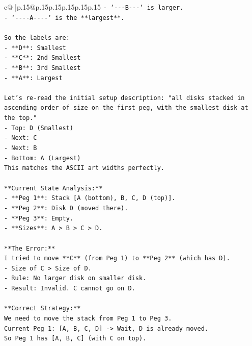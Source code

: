 \documentclass{article}
\begin{document}
{\begin{supertabular}{c@{$\;$}|p{.15\linewidth}@{}p{.15\linewidth}p{.15\linewidth}p{.15\linewidth}p{.15\linewidth}p{.15\linewidth}}
{{{\texttt{{-} `{-}{-}{-}B{-}{-}{-}` is larger.} \\
\texttt{{-} `{-}{-}{-}{-}A{-}{-}{-}{-}` is the **largest**.} \\
\\ 
\texttt{So the labels are:} \\
\texttt{{-} **D**: Smallest} \\
\texttt{{-} **C**: 2nd Smallest} \\
\texttt{{-} **B**: 3rd Smallest} \\
\texttt{{-} **A**: Largest} \\
\\ 
\texttt{Let's re{-}read the initial setup description: "all disks stacked in ascending order of size on the first peg, with the smallest disk at the top."} \\
\texttt{{-} Top: D (Smallest)} \\
\texttt{{-} Next: C} \\
\texttt{{-} Next: B} \\
\texttt{{-} Bottom: A (Largest)} \\
\texttt{This matches the ASCII art widths perfectly.} \\
\\ 
\texttt{**Current State Analysis:**} \\
\texttt{{-} **Peg 1**: Stack {[}A (bottom), B, C, D (top){]}.} \\
\texttt{{-} **Peg 2**: Disk D (moved there).} \\
\texttt{{-} **Peg 3**: Empty.} \\
\texttt{{-} **Sizes**: A > B > C > D.} \\
\\ 
\texttt{**The Error:**} \\
\texttt{I tried to move **C** (from Peg 1) to **Peg 2** (which has D).} \\
\texttt{{-} Size of C > Size of D.} \\
\texttt{{-} Rule: No larger disk on smaller disk.} \\
\texttt{{-} Result: Invalid. C cannot go on D.} \\
\\ 
\texttt{**Correct Strategy:**} \\
\texttt{We need to move the stack from Peg 1 to Peg 3.} \\
\texttt{Current Peg 1: {[}A, B, C, D{]} {-}> Wait, D is already moved.} \\
\texttt{So Peg 1 has {[}A, B, C{]} (with C on top).} \\
}}}
\end{supertabular}}
\end{document}
